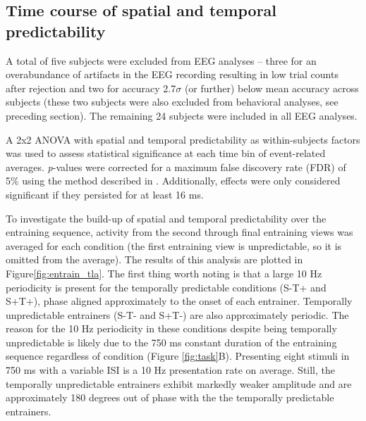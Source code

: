 \documentclass[dwyatte_dissertation.tex]{subfiles}
\begin{document}

\subsection{Time course of spatial and temporal predictability}

A total of five subjects were excluded from EEG analyses -- three for an overabundance of artifacts in the EEG recording resulting in low trial counts after rejection and two for accuracy 2.7$\sigma$ (or further) below mean accuracy across subjects (these two subjects were also excluded from behavioral analyses, see preceding section). The remaining 24 subjects were included in all EEG analyses. 

A 2x2 ANOVA with spatial and temporal predictability as within-subjects factors was used to assess statistical significance at each time bin of event-related averages. \textit{p}-values were corrected for a maximum false discovery rate (FDR) of 5\% using the method described in . Additionally, effects were only considered significant if they persisted for at least 16 ms.

To investigate the build-up of spatial and temporal predictability over the entraining sequence, activity from the second through final entraining views was averaged for each condition (the first entraining view is unpredictable, so it is omitted from the average). The results of this analysis are plotted in Figure\ref{fig:entrain_tla}. The first thing worth noting is that a large 10 Hz periodicity is present for the temporally predictable conditions (S-T+ and S+T+), phase aligned approximately to the onset of each entrainer. Temporally unpredictable entrainers (S-T- and S+T-) are also approximately periodic. The reason for the 10 Hz periodicity in these conditions despite being temporally unpredictable is likely due to the 750 ms constant duration of the entraining sequence regardless of condition (Figure \ref{fig:task}B). Presenting eight stimuli in 750 ms with a variable ISI is a 10 Hz presentation rate on average. Still, the temporally unpredictable entrainers exhibit markedly weaker amplitude and are approximately 180 degrees out of phase with the the temporally predictable entrainers.
\end{document}
